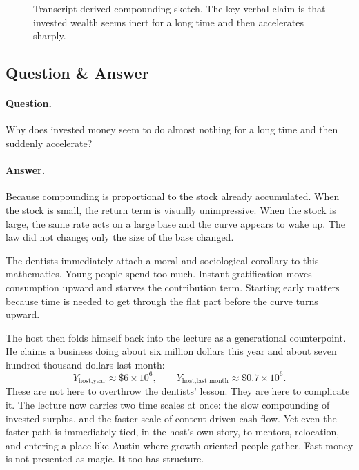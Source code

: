 \begin{figure}[h]
\centering
{}
\caption{Transcript-derived compounding sketch. The key verbal claim is that invested wealth seems inert for a long time and then accelerates sharply.}
\end{figure}

\subsection{Question \& Answer}

\paragraph{Question.} Why does invested money seem to do almost nothing for a long time and then suddenly accelerate?

\paragraph{Answer.} Because compounding is proportional to the stock already accumulated. When the stock is small, the return term is visually unimpressive. When the stock is large, the same rate acts on a large base and the curve appears to wake up. The law did not change; only the size of the base changed.

The dentists immediately attach a moral and sociological corollary to this mathematics. Young people spend too much. Instant gratification moves consumption upward and starves the contribution term. Starting early matters because time is needed to get through the flat part before the curve turns upward.

The host then folds himself back into the lecture as a generational counterpoint. He claims a business doing about six million dollars this year and about seven hundred thousand dollars last month:
\begin{equation}
Y_{\text{host,year}} \approx \$6 \times 10^6,
\qquad
Y_{\text{host,last month}} \approx \$0.7 \times 10^6.
\end{equation}
These are not here to overthrow the dentists' lesson. They are here to complicate it. The lecture now carries two time scales at once: the slow compounding of invested surplus, and the faster scale of content-driven cash flow. Yet even the faster path is immediately tied, in the host's own story, to mentors, relocation, and entering a place like Austin where growth-oriented people gather. Fast money is not presented as magic. It too has structure.

